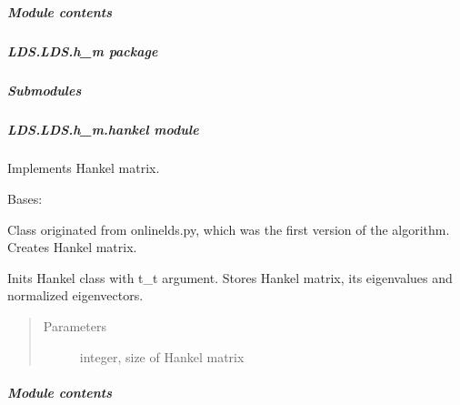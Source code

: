 \documentclass[letterpaper,10pt,english]{sphinxmanual}
\begin{document}
\subparagraph{Module contents}
\label{\detokenize{LDS.LDS.filters:module-LDS.LDS.filters}}\label{\detokenize{LDS.LDS.filters:module-contents}}

\subparagraph{LDS.LDS.h\_m package}
\label{\detokenize{LDS.LDS.h_m:lds-lds-h-m-package}}\label{\detokenize{LDS.LDS.h_m::doc}}

\subparagraph{Submodules}
\label{\detokenize{LDS.LDS.h_m:submodules}}

\subparagraph{LDS.LDS.h\_m.hankel module}
\label{\detokenize{LDS.LDS.h_m:module-LDS.LDS.h_m.hankel}}\label{\detokenize{LDS.LDS.h_m:lds-lds-h-m-hankel-module}}
\sphinxAtStartPar
Implements Hankel matrix.

\begin{fulllineitems}
\label{\detokenize{LDS.LDS.h_m:LDS.LDS.h_m.hankel.Hankel}}
\sphinxAtStartPar
Bases: 

\sphinxAtStartPar
Class originated from onlinelds.py, which
was the first version of the algorithm.
Creates Hankel matrix.

\sphinxAtStartPar
Inits Hankel class with t\_t argument.
Stores Hankel matrix, its eigenvalues
and normalized eigenvectors.
\begin{quote}\begin{description}
\item[{Parameters}] \leavevmode
\sphinxAtStartPar
{} \textendash{} integer, size of Hankel matrix

\end{description}\end{quote}

\end{fulllineitems}



\subparagraph{Module contents}
\label{\detokenize{LDS.LDS.h_m:module-LDS.LDS.h_m}}\label{\detokenize{LDS.LDS.h_m:module-contents}}
\end{document}
